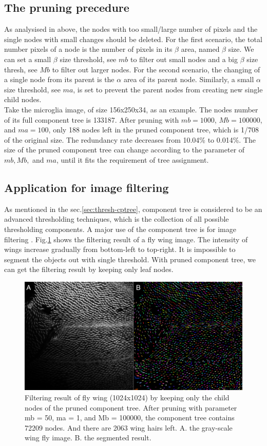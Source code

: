 \subsection{The pruning precedure}
As analysised in above, the nodes with too small/large number of pixels and the single nodes with small changes should be deleted. For the first scenario, the total number pixels of a node is the number of pixels in its $\beta$ area, named $\beta$ size. We can set a small $\beta$ size threshold, see $mb$ to filter out small nodes and a big $\beta$ size thresh, see $Mb$ to filter out larger nodes. For the second scenario, the changing of a single node from its parent is the $\alpha$ area of its parent node. Similarly, a small $\alpha$ size threshold, see $ma$, is set to prevent the parent nodes from creating new single child nodes.\\
Take the microglia image, of size 156x250x34, as an example. The nodes number of its full component tree is 133187. After pruning with $mb = 1000$, $Mb = 100000$, and $ ma = 100$, only 188 nodes left in the pruned component tree, which is 1/708 of the original size. The redundancy rate decreases from 10.04\% to 0.014\%. The size of the pruned component tree can change according to the parameter of $mb, Mb,$ and $ma$, until it fits the requirement of tree assignment.
\subsection{Application for image filtering}
As mentioned in the sec.\ref{sec:thresh-cptree}, component tree is considered to be an advanced thresholding techniques, which is the collection of all possible thresholding components. A major use of the component tree is for image filtering \cite{najman2006building}. Fig.\ref{fig:cptree-flywing} shows the filtering result of a fly wing image. The intensity of wings increase gradually from bottom-left to top-right. It is impossible to segment the objects out with single threshold. With pruned component tree, we can get the filtering result by keeping only leaf nodes.

\begin{figure}[htbp]
\centering
\includegraphics[width=1.0\textwidth]{images/cptree_flywing}
\caption{Filtering result of fly wing (1024x1024) by keeping only the child nodes of the pruned component tree. After pruning with parameter mb = 50, ma = 1, and Mb = 100000, the component tree contains 72209 nodes. And there are 2063 wing hairs left. A. the gray-scale wing fly image. B. the segmented result.}
\label{fig:cptree-flywing}
\end{figure}


